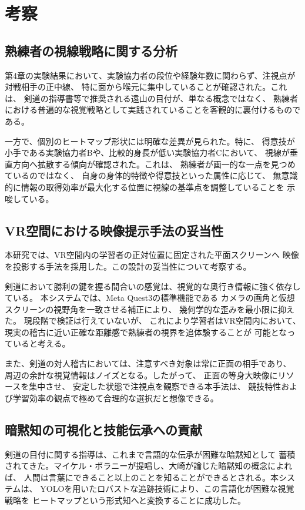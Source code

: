 \documentclass[dvipdfmx]{ujreport}
\begin{document}
    \section{考察}

\subsection{熟練者の視線戦略に関する分析}
    第4章の実験結果において、実験協力者の段位や経験年数に関わらず、注視点が対戦相手の正中線、
    特に面から喉元に集中していることが確認された。これは、
    剣道の指導書等で推奨される遠山の目付が、単なる概念ではなく、
    熟練者における普遍的な視覚戦略として実践されていることを客観的に裏付けるものである。

    一方で、個別のヒートマップ形状には明確な差異が見られた。特に、
    得意技が小手である実験協力者Bや、比較的身長が低い実験協力者Cにおいて、
    視線が垂直方向へ拡散する傾向が確認された。これは、
    熟練者が画一的な一点を見つめているのではなく、
    自身の身体的特徴や得意技といった属性に応じて、
    無意識的に情報の取得効率が最大化する位置に視線の基準点を調整していることを
    示唆している。

\subsection{VR空間における映像提示手法の妥当性}
    本研究では、VR空間内の学習者の正対位置に固定された平面スクリーンへ
    映像を投影する手法を採用した。この設計の妥当性について考察する。

    剣道において勝利の鍵を握る間合いの感覚は、視覚的な奥行き情報に強く依存している。
    本システムでは、Meta Quest3の標準機能である
    カメラの画角と仮想スクリーンの視野角を一致させる補正により、
    幾何学的な歪みを最小限に抑えた。
    現段階で検証は行えていないが、
    これにより学習者はVR空間内において、
    現実の稽古に近い正確な距離感で熟練者の視界を追体験することが
    可能となっていると考える。

    また、剣道の対人稽古においては、注意すべき対象は常に正面の相手であり、
    周辺の余計な視覚情報はノイズとなる。したがって、
    正面の等身大映像にリソースを集中させ、
    安定した状態で注視点を観察できる本手法は、
    競技特性および学習効率の観点で極めて合理的な選択だと想像できる。

\subsection{暗黙知の可視化と技能伝承への貢献}
    剣道の目付に関する指導は、これまで言語的な伝承が困難な暗黙知として
    蓄積されてきた。マイケル・ポラニーが提唱し、大崎が論じた暗黙知の概念によれば\cite{kurino_tacit}、
    人間は言葉にできること以上のことを知ることができるとされる。本システムは、
    YOLOを用いたロバストな追跡技術により、この言語化が困難な視覚戦略を
    ヒートマップという形式知へと変換することに成功した。
\end{document}
